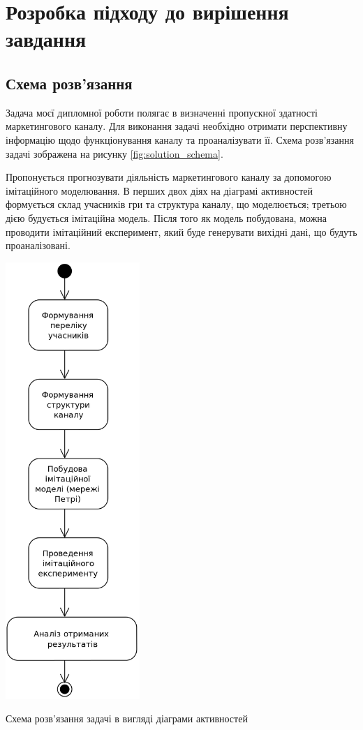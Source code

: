 \section{Розробка підходу до вирішення завдання}

 
\subsection{Схема розв’язання}
Задача моєї дипломної роботи полягає в визначенні пропускної здатності маркетингового каналу. Для виконання задачі необхідно отримати перспективну інформацію щодо функціонування каналу та проаналізувати її. Схема розв’язання задачі зображена на рисунку \ref{fig:solution_schema}.

Пропонується прогнозувати діяльність маркетингового каналу за допомогою імітаційного моделювання. В перших двох діях на діаграмі активностей формується склад учасників гри та структура каналу, що моделюється; третьою дією будується імітаційна модель. Після того як модель побудована, можна проводити імітаційний експеримент, який буде генерувати вихідні дані, що будуть проаналізовані.

            \begin{stdfigure}
                \includegraphics[width=2in]{images/uml_act_solution_schema.png}
                \caption{Схема розв’язання задачі в вигляді діаграми активностей}
                \label{fig:solution_schema}
            \end{stdfigure}   
